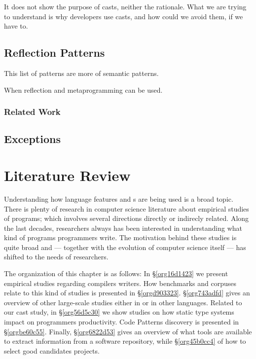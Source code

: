 \documentclass{usiinfdocprop}
\begin{document}
\cite{staicu_understanding_2017}

\cite{buse_synthesizing_2012}

It does not show the purpose of casts, neither the rationale.
What we are trying to understand is why developers use casts,
and how could we avoid them, if we have to.

\section{Reflection Patterns \label{orge95dd9f}}
\label{sec:org599a2f4}

This list of patterns are more of semantic patterns.

When reflection and metaprogramming can be used.

\subsection{Related Work}
\label{sec:orga9d3212}
\section{Exceptions \label{org4b1f052}}
\label{sec:org6cde6d1}

\chapter{Literature Review \label{orge6349f7}}
\label{sec:org3dd745a}
Understanding how language features and \api{}s are being used is a broad topic.
There is plenty of research in computer science literature about empirical studies of programs; which involves several directions directly or indirecly related.
Along the last decades, researchers always has been interested in understanding what kind of programs programmers write.
The motivation behind these studies is quite broad and --- together with the evolution of computer science itself --- has shifted to the needs of researchers.

The organization of this chapter is as follows:
In \S\ref{org16d1423} we present empirical studies regarding compilers writers.
How benchmarks and corpuses relate to this kind of studies is presented in \S\ref{orgd903323}.
\S\ref{org743adfd} gives an overview of other large-scale studies either in \java{} or in other languages.
Related to our cast study, in \S\ref{org56d5c30} we show studies on how static type systems impact on programmers productivity.
Code Patterns discovery is presented in \S\ref{orgbe60c55}.
Finally, \S\ref{org6822d53} gives an overview of what tools are available to extract information from a software repository, while \S\ref{org45b0cc4} of how to select good candidates projects.
\end{document}
